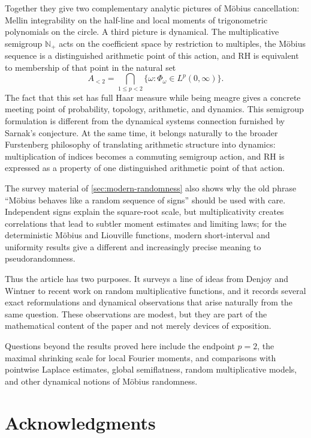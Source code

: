 \documentclass[11pt]{article}
\theoremstyle{remark}
\begin{document}
Together they give two complementary analytic pictures of M\"obius
cancellation: Mellin integrability on the half-line and local moments of
trigonometric polynomials on the circle.  A third picture is dynamical.
The multiplicative semigroup \(\mathbb N_+\) acts on the coefficient
space by restriction to multiples, the M\"obius sequence is a
 distinguished arithmetic point of this action, and RH is equivalent to
membership of that point in the natural set
\[
A_{<2}=\bigcap_{1\leq p<2}
\{\omega:\Phi_\omega\in L^p(0,\infty)\}.
\]
The fact that this set has full Haar measure while being meagre gives a
concrete meeting point of probability, topology, arithmetic, and
dynamics.  This semigroup formulation is different from the dynamical
systems connection furnished by Sarnak's conjecture.  At the same time,
it belongs naturally to the broader Furstenberg philosophy of translating
arithmetic structure into dynamics: multiplication of indices becomes a
commuting semigroup action, and RH is expressed as a property of one
distinguished arithmetic point of that action.

The survey material of \cref{sec:modern-randomness} also shows why the
old phrase ``M\"obius behaves like a random sequence of signs'' should
be used with care.  Independent signs explain the square-root scale,
but multiplicativity creates correlations that lead to subtler moment
estimates and limiting laws; for the deterministic M\"obius and
Liouville functions, modern short-interval and uniformity results give a
different and increasingly precise meaning to pseudorandomness.

Thus the article has two purposes.  It surveys a line of ideas from
Denjoy and Wintner to recent work on random multiplicative functions,
and it records several exact reformulations and dynamical observations
that arise naturally from the same question.  These observations are
modest, but they are part of the mathematical content of the paper and
not merely devices of exposition.

Questions beyond the results proved here include the endpoint \(p=2\),
the maximal shrinking scale for local Fourier moments, and comparisons
with pointwise Laplace estimates, global semiflatness, random
multiplicative models, and other dynamical notions of M\"obius
randomness.

\section*{Acknowledgments}
\end{document}
